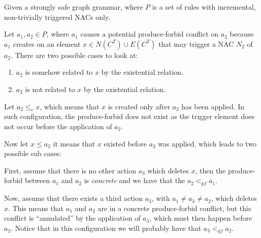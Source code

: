 \begin{definition} Given \doublyTypedGraphGrammarCore{} a strongly safe graph grammar, where $P$ is a set of rules with incremental, non-trivially triggered NACs only.

\hfill

  Let $a_1,a_2 \in P$, where $a_1$ causes a potential produce-forbid conflict on $a_2$ because $a_1$ creates on an element $x \in N(C^T) \cup E(C^T)$ that may trigger a NAC $N_2$ of $a_2$. There are two possible cases to look at:

  \begin{enumerate}
    \item $a_2$ is somehow related to $x$ by the existential relation.
    \item $a_2$ is not related to $x$ by the existential relation.
  \end{enumerate}

\begin{description}[style=nextline]
  \item[Related element:]
  Let $a_2 \leq_e x$, which means that $x$ is created only after $a_2$ has been applied. In such configuration, the produce-forbid does not exist as the trigger element does not occur before the application of $a_2$. 
    
  Now let $x \leq a_2$ it means that $x$ existed before $a_2$ was applied, which leads to two possible sub cases: 
  
  First, assume that there is no other action $a_3$ which deletes $x$, then the produce-forbid between $a_1$ and $a_2$ is \emph{concrete} and we have that the $a_2 <_{pf} a_1$.

    Now, assume that there exists a third action $a_3$, with $a_1 \ne a_3 \ne a_2$, which deletes $x$. This means that $a_1$ and $a_2$ are in a concrete produce-forbid conflict, but this conflict is ``annulated'' by the application of $a_3$, which must then happen before $a_2$. Notice that in this configuration we will probably have that $a_3 <_{df} a_2$.


\end{description}
\end{definition}
